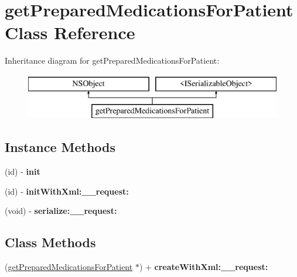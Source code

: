 \hypertarget{interfaceget_prepared_medications_for_patient}{}\section{get\+Prepared\+Medications\+For\+Patient Class Reference}
\label{interfaceget_prepared_medications_for_patient}
Inheritance diagram for get\+Prepared\+Medications\+For\+Patient\+:\begin{figure}[H]
\begin{center}
\leavevmode
\includegraphics[height=2.000000cm]{interfaceget_prepared_medications_for_patient}
\end{center}
\end{figure}
\subsection*{Instance Methods}
\begin{DoxyCompactItemize}
\item 
\hypertarget{interfaceget_prepared_medications_for_patient_a326f758978ee0e2a77169c8ac810e3be}{}(id) -\/ {\bfseries init}\label{interfaceget_prepared_medications_for_patient_a326f758978ee0e2a77169c8ac810e3be}

\item 
\hypertarget{interfaceget_prepared_medications_for_patient_ab70e037ba81ebd4bf95a7508ee69d4bf}{}(id) -\/ {\bfseries init\+With\+Xml\+:\+\_\+\+\_\+request\+:}\label{interfaceget_prepared_medications_for_patient_ab70e037ba81ebd4bf95a7508ee69d4bf}

\item 
\hypertarget{interfaceget_prepared_medications_for_patient_aa87456a9fe44ff3210666933693809c8}{}(void) -\/ {\bfseries serialize\+:\+\_\+\+\_\+request\+:}\label{interfaceget_prepared_medications_for_patient_aa87456a9fe44ff3210666933693809c8}

\end{DoxyCompactItemize}
\subsection*{Class Methods}
\begin{DoxyCompactItemize}
\item 
\hypertarget{interfaceget_prepared_medications_for_patient_adebbf8bd14ef64b8e33963b18a903916}{}(\hyperlink{interfaceget_prepared_medications_for_patient}{get\+Prepared\+Medications\+For\+Patient} $\ast$) + {\bfseries create\+With\+Xml\+:\+\_\+\+\_\+request\+:}\label{interfaceget_prepared_medications_for_patient_adebbf8bd14ef64b8e33963b18a903916}

\end{DoxyCompactItemize}
